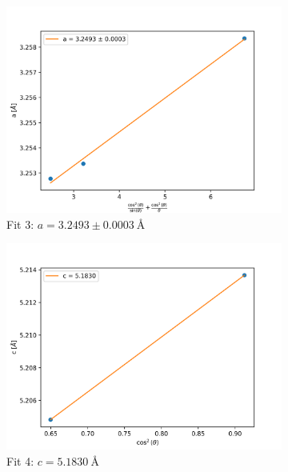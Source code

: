 \documentclass{article}
\begin{document}
\begin{figure}[h]
\begin {subfigure}{0.3\textwidth}
		\includegraphics[width=\textwidth]{Figures/ZnONelsonA.png}
		\caption{Fit 3: $a=3.2493 \pm \SI{0.0003}{\angstrom} $}
		\label{fig:ZnOFit3}
	\end{subfigure}
	\begin {subfigure}{0.3\textwidth}
		\centering
		\includegraphics[width=\textwidth]{Figures/ZnOCosC.png}
		\caption{Fit 4: $c=\SI{5.1830}{\angstrom}$} 
		\label{fig:ZnOFit4}
	\end{subfigure}
	\hfill
	\begin {subfigure}{0.3\textwidth}
		\centering

\end{subfigure}
\end{figure}
\end{document}
